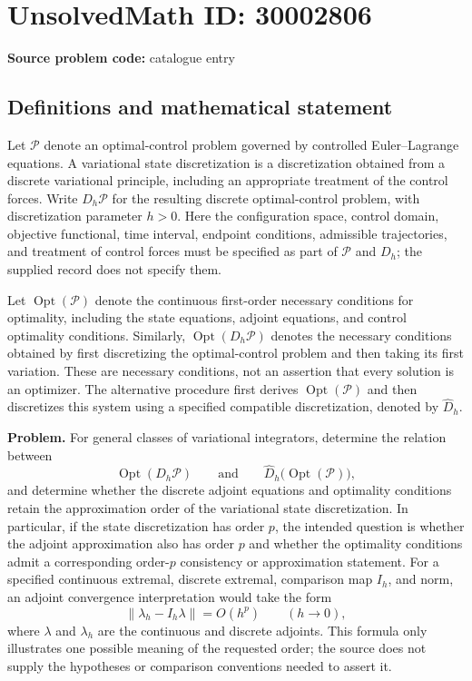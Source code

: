 \documentclass[11pt]{article}
\begin{document}
\section*{UnsolvedMath ID: 30002806}
\textbf{Source problem code:} catalogue entry
\subsection{Definitions and mathematical statement}
Let \(\mathcal P\) denote an optimal-control problem governed by controlled Euler--Lagrange equations. A variational state discretization is a discretization obtained from a discrete variational principle, including an appropriate treatment of the control forces. Write \(D_h\mathcal P\) for the resulting discrete optimal-control problem, with discretization parameter \(h>0\). Here the configuration space, control domain, objective functional, time interval, endpoint conditions, admissible trajectories, and treatment of control forces must be specified as part of \(\mathcal P\) and \(D_h\); the supplied record does not specify them.

Let \(\operatorname{Opt}(\mathcal P)\) denote the continuous first-order necessary conditions for optimality, including the state equations, adjoint equations, and control optimality conditions. Similarly, \(\operatorname{Opt}(D_h\mathcal P)\) denotes the necessary conditions obtained by first discretizing the optimal-control problem and then taking its first variation. These are necessary conditions, not an assertion that every solution is an optimizer. The alternative procedure first derives \(\operatorname{Opt}(\mathcal P)\) and then discretizes this system using a specified compatible discretization, denoted by \(\widehat D_h\).

\textbf{Problem.} For general classes of variational integrators, determine the relation between
\[
\operatorname{Opt}(D_h\mathcal P)
\qquad\text{and}\qquad
\widehat D_h\bigl(\operatorname{Opt}(\mathcal P)\bigr),
\]
and determine whether the discrete adjoint equations and optimality conditions retain the approximation order of the variational state discretization. In particular, if the state discretization has order \(p\), the intended question is whether the adjoint approximation also has order \(p\) and whether the optimality conditions admit a corresponding order-\(p\) consistency or approximation statement. For a specified continuous extremal, discrete extremal, comparison map \(I_h\), and norm, an adjoint convergence interpretation would take the form
\[
\|\lambda_h-I_h\lambda\|=O(h^p)
\qquad(h\to0),
\]
where \(\lambda\) and \(\lambda_h\) are the continuous and discrete adjoints. This formula only illustrates one possible meaning of the requested order; the source does not supply the hypotheses or comparison conventions needed to assert it.
\end{document}

